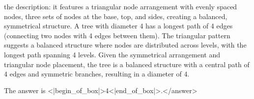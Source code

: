 the description: it features a triangular node arrangement with evenly spaced nodes, three sets of nodes at the base, top, and sides, creating a balanced, symmetrical structure. A tree with diameter 4 has a longest path of 4 edges (connecting two nodes with 4 edges between them). The triangular pattern suggests a balanced structure where nodes are distributed across levels, with the longest path spanning 4 levels. Given the symmetrical arrangement and triangular node placement, the tree is a balanced structure with a central path of 4 edges and symmetric branches, resulting in a diameter of 4.  

The answer is <|begin_of_box|>4<|end_of_box|>.</answer>